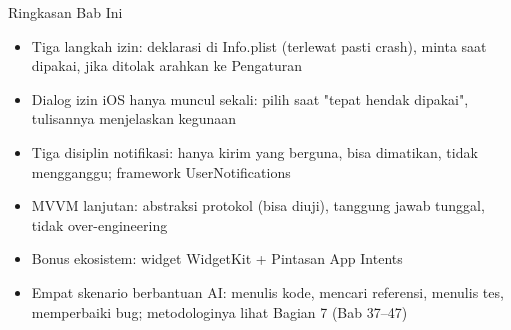 \begin{tcbsummary}{Ringkasan Bab Ini}
\begin{itemize}
  \item Tiga langkah izin: deklarasi di Info.plist (terlewat pasti crash), minta saat dipakai, jika ditolak arahkan ke Pengaturan
  \item Dialog izin iOS hanya muncul sekali: pilih saat "tepat hendak dipakai", tulisannya menjelaskan kegunaan
  \item Tiga disiplin notifikasi: hanya kirim yang berguna, bisa dimatikan, tidak mengganggu; framework UserNotifications
  \item MVVM lanjutan: abstraksi protokol (bisa diuji), tanggung jawab tunggal, tidak over-engineering
  \item Bonus ekosistem: widget WidgetKit + Pintasan App Intents
  \item Empat skenario berbantuan AI: menulis kode, mencari referensi, menulis tes, memperbaiki bug; metodologinya lihat Bagian 7 (Bab 37–47)
\end{itemize}

\end{tcbsummary}
